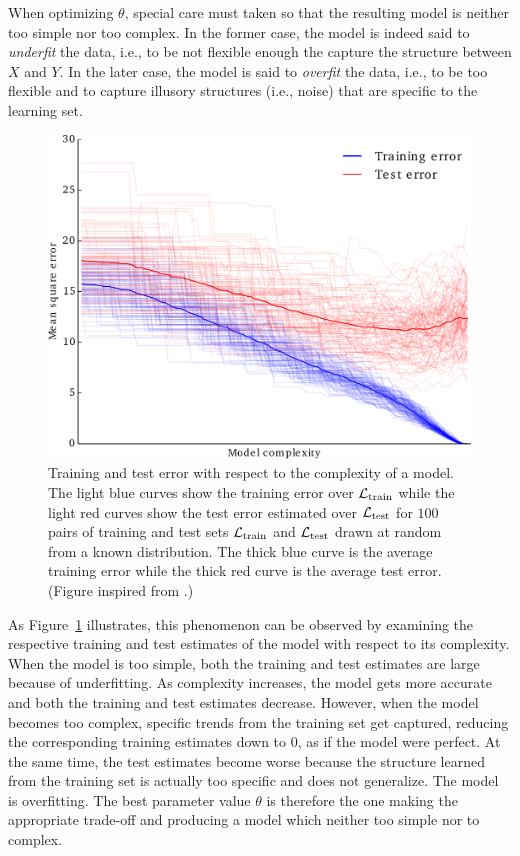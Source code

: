 When optimizing $\theta$, special care must taken so that the resulting model
is neither too simple nor too complex. In the former case, the model is indeed
said to \textit{underfit} the data, i.e., to be not flexible enough the capture
the structure between $X$ and $Y$. In the later case, the model is said to
\textit{overfit} the data, i.e., to be too flexible and to capture illusory
structures (i.e., noise) that are specific to the learning set.

\begin{figure}
    \centering
    \includegraphics[scale=0.5]{figures/ch2_train_test_error.pdf}
    \caption{Training and test error with respect to the complexity
             of a model. The light blue curves show the training error over
             ${\cal L}_\text{train}$ while the light red curves show the test
             error estimated over ${\cal L}_\text{test}$ for $100$ pairs of training
             and test sets ${\cal L}_\text{train}$ and ${\cal L}_\text{test}$
             drawn at random from a known distribution. The thick blue curve
             is the average training error while the thick red curve is the
             average test error. (Figure inspired from \citep{hastie:2005}.) }
    \label{fig:train-test-error}
\end{figure}

As Figure~\ref{fig:train-test-error}
illustrates, this phenomenon can be observed by examining the
respective training and test estimates of the model with respect to its
complexity. When the model is too simple, both the training and test estimates
are large because of underfitting. As complexity increases, the model gets more
accurate and both the training and test estimates decrease. However, when the
model becomes too complex, specific trends from the training set get captured,
reducing the corresponding training estimates down to $0$, as if the model were
perfect. At the same time, the test estimates become worse because the
structure learned from the training set is actually too specific and does not
generalize. The model is overfitting. The best parameter value $\theta$ is
therefore the one making the appropriate trade-off and producing a model which
neither too simple nor to complex.

